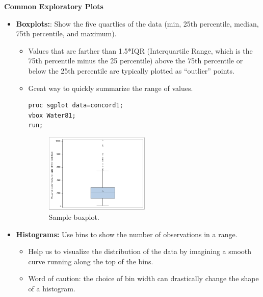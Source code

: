 \documentclass[12pt]{notes}
\begin{document}
\textbf{Common Exploratory Plots}
\begin{itemize}
\item \textbf{Boxplots:}: Show the five quartlies of the data (min, 25th percentile, median, 75th percentile, and maximum). 
\begin{itemize}
\item Values that are farther than 1.5*IQR (Interquartile Range, which is the 75th percentile minus the 25 percentile) above the 75th percentile or below the 25th percentile are typically plotted as ``outlier'' points. 
\item Great way to quickly summarize the range of values.

\begin{verbatim}
proc sgplot data=concord1;
vbox Water81;
run;
\end{verbatim}

\begin{minipage}[l][1cm][c]{\textwidth}
\end{minipage}

\begin{figure}[H]
\centering
\includegraphics[width = 0.5\textwidth]{figures/module1/sampBox.png}
\caption{Sample boxplot.}
\end{figure}

\end{itemize}
\item \textbf{Histograms:} Use bins to show the number of observations in a range. 
\begin{itemize}
\item Help us to visualize the distribution of the data by imagining a smooth curve running along the top of the bins. 
\item Word of caution: the choice of bin width can drastically change the shape of a histogram. 
\end{itemize}


\end{itemize}
\end{document}
